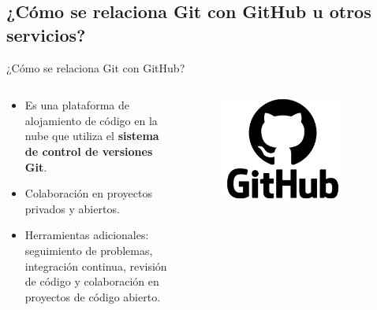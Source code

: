 \documentclass{beamer}
\begin{document}
\subsection{¿Cómo se relaciona Git con GitHub u otros servicios?} 

\begin{frame}{¿Cómo se relaciona Git con GitHub?} 


  \begin{columns}
    \begin{column}{.6\textwidth}

      \begin{itemize}[<+->]

        \item Es una plataforma de alojamiento de código en la nube que utiliza el \textbf{sistema de control de versiones Git}.
        \item Colaboración en proyectos privados y abiertos. 
        \item Herramientas adicionales: seguimiento de problemas, integración continua, revisión de código y colaboración en proyectos de código abierto.
      \end{itemize}
      
    \end{column}

    \begin{column}{.4\textwidth}
      \begin{figure}
        \includegraphics[width=0.8\textwidth]{images/logo_github.png}
      \end{figure}
    \end{column}

  \end{columns}
  

\end{frame}
\end{document}
